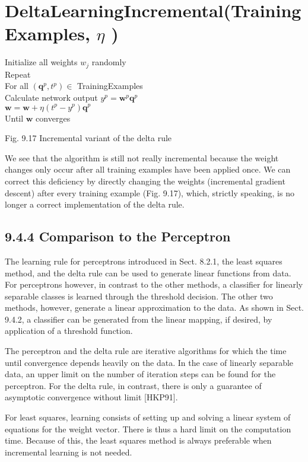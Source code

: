 \documentclass[10pt]{article}
\begin{document}
\section*{DeltaLearningIncremental(TrainingExamples, $\eta$ )}
Initialize all weights $w_{j}$ randomly\\
Repeat\\
For all $\left(\boldsymbol{q}^{p}, t^{p}\right) \in$ TrainingExamples\\
Calculate network output $y^{p}=\boldsymbol{w}^{p} \boldsymbol{q}^{p}$\\
$\boldsymbol{w}=\boldsymbol{w}+\eta\left(t^{p}-y^{p}\right) \boldsymbol{q}^{p}$\\
Until $\boldsymbol{w}$ converges

Fig. 9.17 Incremental variant of the delta rule

We see that the algorithm is still not really incremental because the weight changes only occur after all training examples have been applied once. We can correct this deficiency by directly changing the weights (incremental gradient descent) after every training example (Fig. 9.17), which, strictly speaking, is no longer a correct implementation of the delta rule.

\subsection*{9.4.4 Comparison to the Perceptron}
The learning rule for perceptrons introduced in Sect. 8.2.1, the least squares method, and the delta rule can be used to generate linear functions from data. For perceptrons however, in contrast to the other methods, a classifier for linearly separable classes is learned through the threshold decision. The other two methods, however, generate a linear approximation to the data. As shown in Sect. 9.4.2, a classifier can be generated from the linear mapping, if desired, by application of a threshold function.

The perceptron and the delta rule are iterative algorithms for which the time until convergence depends heavily on the data. In the case of linearly separable data, an upper limit on the number of iteration steps can be found for the perceptron. For the delta rule, in contrast, there is only a guarantee of asymptotic convergence without limit [HKP91].

For least squares, learning consists of setting up and solving a linear system of equations for the weight vector. There is thus a hard limit on the computation time. Because of this, the least squares method is always preferable when incremental learning is not needed.
\end{document}
